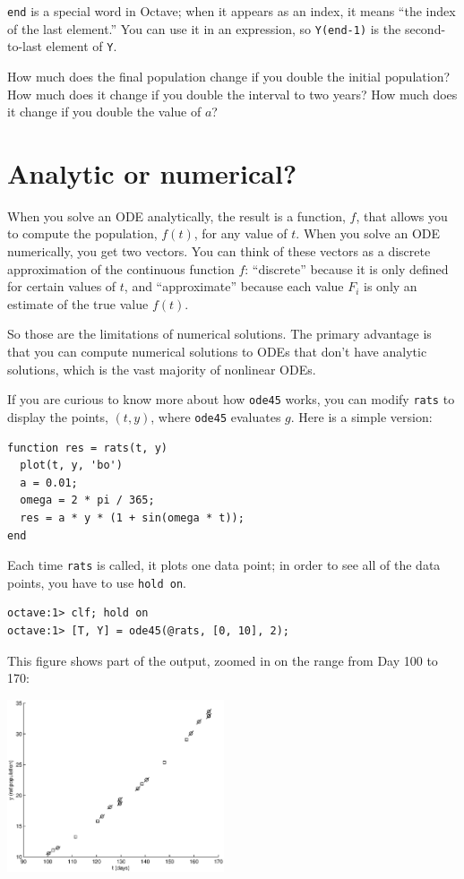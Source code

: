 \documentclass{book}
\begin{document}
{\tt end} is a special word in Octave; when it appears as an index,
it means ``the index of the last element.'' You can use it in an
expression, so {\tt Y(end-1)} is the second-to-last element of
{\tt Y}.

How much does the final population change if you double the initial
population? How much does it change if you double the interval
to two years? How much does it change if you double the value
of $a$?


\section{Analytic or numerical?}

When you solve an ODE analytically, the result is a function, $f$,
that allows you to compute the population, $f(t)$, for any value of
$t$. When you solve an ODE numerically, you get two vectors. You can
think of these vectors as a discrete approximation of the continuous
function $f$: ``discrete'' because it is only defined for certain
values of $t$, and ``approximate'' because each value $F_i$
is only an estimate of the true value $f(t)$.

So those are the limitations of numerical solutions. The primary
advantage is that you can compute numerical solutions to ODEs that
don't have analytic solutions, which is the vast majority
of nonlinear ODEs.

If you are curious to know more about how {\tt ode45} works, you
can modify {\tt rats} to display the points, $(t, y)$, where
{\tt ode45} evaluates $g$. Here is a simple version:

\begin{verbatim}
function res = rats(t, y)
  plot(t, y, 'bo')
  a = 0.01;
  omega = 2 * pi / 365;
  res = a * y * (1 + sin(omega * t));
end
\end{verbatim}

Each time {\tt rats} is called, it plots one data point; in order
to see all of the data points, you have to use {\tt hold on}.

\begin{verbatim}
octave:1> clf; hold on
octave:1> [T, Y] = ode45(@rats, [0, 10], 2);
\end{verbatim}

This figure shows part of the output, zoomed
in on the range from Day 100 to 170:

\beforefig \centerline{\includegraphics[height=2in]{figs/ode45.eps}}
\end{document}
